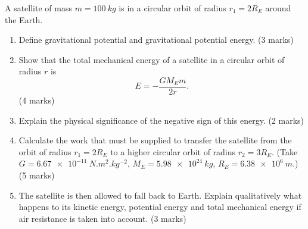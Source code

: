 \documentclass[11pt]{article}
\begin{document}
\begin{exercice}
A satellite of mass $m = \SI{100}{kg}$ is in a circular orbit of radius $r_1 = 2R_E$ around the Earth.
\begin{enumerate}
\item Define gravitational potential and gravitational potential energy. \hfill (3 marks)
\item Show that the total mechanical energy of a satellite in a circular orbit of radius $r$ is
\[ E = -\frac{G M_E m}{2r}. \] \hfill (4 marks)
\item Explain the physical significance of the negative sign of this energy. \hfill (2 marks)
\item Calculate the work that must be supplied to transfer the satellite from the orbit of radius $r_1 = 2R_E$ to a higher circular orbit of radius $r_2 = 3R_E$. (Take $G = \SI{6.67e-11}{N.m^2.kg^{-2}}$, $M_E = \SI{5.98e24}{kg}$, $R_E = \SI{6.38e6}{m}$.) \hfill (5 marks)
\item The satellite is then allowed to fall back to Earth. Explain qualitatively what happens to its kinetic energy, potential energy and total mechanical energy if air resistance is taken into account. \hfill (3 marks)
\end{enumerate}
\end{exercice}
\end{document}
